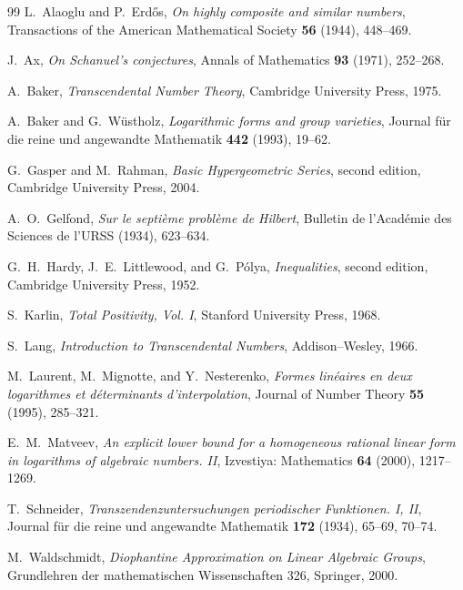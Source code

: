 \documentclass[11pt]{article}
\theoremstyle{definition}
\begin{document}
\begin{thebibliography}{99}
L.~Alaoglu and P.~Erd\H{o}s,
\emph{On highly composite and similar numbers},
Transactions of the American Mathematical Society \textbf{56} (1944), 448--469.

J.~Ax,
\emph{On Schanuel's conjectures},
Annals of Mathematics \textbf{93} (1971), 252--268.

A.~Baker,
\emph{Transcendental Number Theory},
Cambridge University Press, 1975.

A.~Baker and G.~W\"ustholz,
\emph{Logarithmic forms and group varieties},
Journal f\"ur die reine und angewandte Mathematik \textbf{442} (1993), 19--62.

G.~Gasper and M.~Rahman,
\emph{Basic Hypergeometric Series}, second edition,
Cambridge University Press, 2004.

A.~O.~Gelfond,
\emph{Sur le septi\`eme probl\`eme de Hilbert},
Bulletin de l'Acad\'emie des Sciences de l'URSS (1934), 623--634.

G.~H.~Hardy, J.~E.~Littlewood, and G.~P\'olya,
\emph{Inequalities}, second edition,
Cambridge University Press, 1952.

S.~Karlin,
\emph{Total Positivity, Vol. I},
Stanford University Press, 1968.

S.~Lang,
\emph{Introduction to Transcendental Numbers},
Addison--Wesley, 1966.

M.~Laurent, M.~Mignotte, and Y.~Nesterenko,
\emph{Formes lin\'eaires en deux logarithmes et d\'eterminants d'interpolation},
Journal of Number Theory \textbf{55} (1995), 285--321.

E.~M.~Matveev,
\emph{An explicit lower bound for a homogeneous rational linear form in logarithms of algebraic numbers. II},
Izvestiya: Mathematics \textbf{64} (2000), 1217--1269.

T.~Schneider,
\emph{Transzendenzuntersuchungen periodischer Funktionen. I, II},
Journal f\"ur die reine und angewandte Mathematik \textbf{172} (1934), 65--69, 70--74.

M.~Waldschmidt,
\emph{Diophantine Approximation on Linear Algebraic Groups},
Grundlehren der mathematischen Wissenschaften 326, Springer, 2000.
\end{thebibliography}
\end{document}
